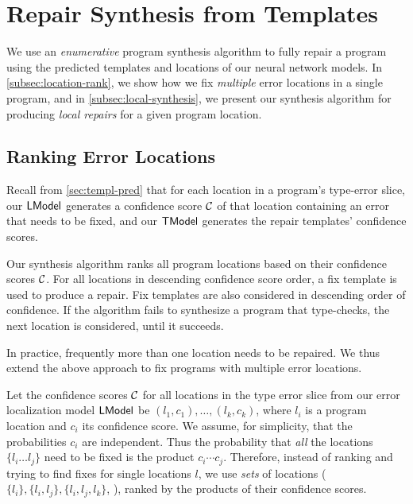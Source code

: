 \section{Repair Synthesis from Templates}
\label{sec:synthesis}
We use an \emph{enumerative} program synthesis algorithm to fully repair a
program using the predicted templates and locations of our neural network
models. In \autoref{subsec:location-rank}, we show how we fix \emph{multiple}
error locations in a single program, and in \autoref{subsec:local-synthesis}, we
present our synthesis algorithm for producing \emph{local repairs} for a given
program location.

\subsection{Ranking Error Locations}
\label{subsec:location-rank}

Recall from \autoref{sec:templ-pred} that for each location in a program's
type-error slice, our $\mathsf{LModel}$ generates a confidence score $\mathcal{C}$ of that
location containing an error that needs to be fixed, and our $\mathsf{TModel}$ generates
the repair templates' confidence scores.

Our synthesis algorithm ranks all program locations based on their confidence
scores $\mathcal{C}$. For all locations in descending confidence
score order, a fix template is used to produce a repair. Fix templates are also
considered in descending order of confidence. If the algorithm fails to
synthesize a program that type-checks, the next location is considered, until it
succeeds.

In practice, frequently more than one location needs to be repaired. We thus
extend the above approach to fix programs with multiple error locations.

Let the confidence scores $\mathcal{C}$ for all locations in the type error slice from
our error localization model $\mathsf{LModel}$ be $(l_1, c_1), \dots, (l_k, c_k)$, where
$l_i$ is a program location and $c_i$ its confidence score. We assume, for
simplicity, that the probabilities $c_i$ are independent. Thus
the probability that \emph{all} the locations $\{l_i \dots l_j\}$ need to be fixed
is the product $c_i \cdots c_j$. Therefore, instead of
ranking and trying to find fixes for single locations $l$,
we use \emph{sets} of locations ($\{l_i\}, \{l_i, l_j\}, \{l_i, l_j, l_k\}$, \etc),
ranked by the products of their confidence scores.


